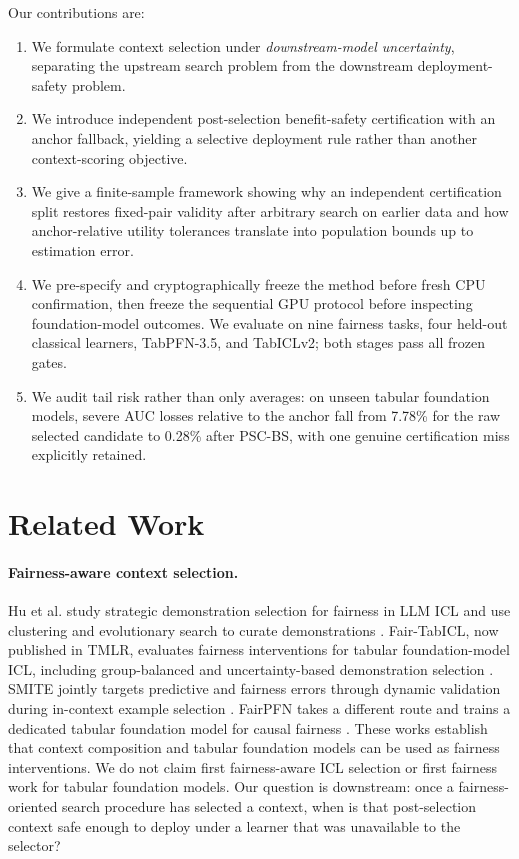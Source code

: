 \documentclass[10pt]{article}
\newcommand{\PSC}{\textsc{PSC-BS}}
\begin{document}
Our contributions are:
\begin{enumerate}[leftmargin=*]
    \item We formulate context selection under \emph{downstream-model uncertainty}, separating the upstream search problem from the downstream deployment-safety problem.
    \item We introduce independent post-selection benefit-safety certification with an anchor fallback, yielding a selective deployment rule rather than another context-scoring objective.
    \item We give a finite-sample framework showing why an independent certification split restores fixed-pair validity after arbitrary search on earlier data and how anchor-relative utility tolerances translate into population bounds up to estimation error.
    \item We pre-specify and cryptographically freeze the method before fresh CPU confirmation, then freeze the sequential GPU protocol before inspecting foundation-model outcomes. We evaluate on nine fairness tasks, four held-out classical learners, TabPFN-3.5, and TabICLv2; both stages pass all frozen gates.
    \item We audit tail risk rather than only averages: on unseen tabular foundation models, severe AUC losses relative to the anchor fall from 7.78\% for the raw selected candidate to 0.28\% after \PSC{}, with one genuine certification miss explicitly retained.
\end{enumerate}

\section{Related Work}

\paragraph{Fairness-aware context selection.}
Hu et al. study strategic demonstration selection for fairness in LLM ICL and use clustering and evolutionary search to curate demonstrations \citep{hu2024strategic}.
Fair-TabICL, now published in TMLR, evaluates fairness interventions for tabular foundation-model ICL, including group-balanced and uncertainty-based demonstration selection \citep{kenfack2026fairtabicl}.
SMITE jointly targets predictive and fairness errors through dynamic validation during in-context example selection \citep{chhikara2025smite}.
FairPFN takes a different route and trains a dedicated tabular foundation model for causal fairness \citep{robertson2025fairpfn}.
These works establish that context composition and tabular foundation models can be used as fairness interventions.
We do not claim first fairness-aware ICL selection or first fairness work for tabular foundation models.
Our question is downstream: once a fairness-oriented search procedure has selected a context, when is that post-selection context safe enough to deploy under a learner that was unavailable to the selector?
\end{document}
